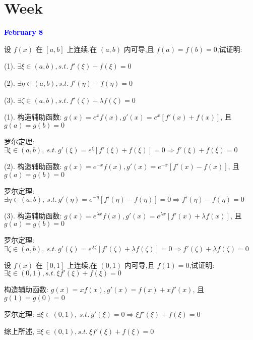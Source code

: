 \section{Week }
\textcolor{blue}{\textbf{February 8}}

\begin{example}[][Exam: 28.2.1]
	设 $f(x)$ 在 $[a,b]$ 上连续,在 $(a,b)$ 内可导,且 $f(a)=f(b)=0$,试证明:

(1). $\exists \xi\in(a,b),s.t.\ f'(\xi)+f(\xi)=0$

(2). $\exists \eta\in(a,b),s.t.\ f'(\eta)-f(\eta)=0$

(3). $\exists \zeta\in(a,b),s.t.\ f'(\zeta)+\lambda f(\zeta)=0$
\end{example}

\begin{solution}

	(1). 构造辅助函数: $g(x) = e^{x}f(x), g'(x) = e^{x}\left[f'(x) + f(x)\right]$, 且 $g(a) = g(b) = 0$

	罗尔定理: $\exists \xi\in(a,b),\ s.t.\ g'(\xi) = e^{\xi}\left[f'(\xi) + f(\xi)\right] = 0\Rightarrow f'(\xi) + f(\xi) = 0$

	

	(2). 构造辅助函数: $g(x) = e^{-x}f(x), g'(x) = e^{-x}\left[f'(x) - f(x)\right]$, 且 $g(a) = g(b) = 0$

	罗尔定理: $\exists \eta\in(a,b),\ s.t.\ g'(\eta) = e^{-\eta}\left[f'(\eta) - f(\eta)\right] = 0\Rightarrow f'(\eta) - f(\eta) = 0$

	

	(3). 构造辅助函数: $g(x) = e^{\lambda x}f(x), g'(x) = e^{\lambda x}\left[f'(x) + \lambda f(x)\right]$, 且 $g(a) = g(b) = 0$

	罗尔定理: $\exists \zeta\in(a,b),\ s.t.\ g'(\zeta) = e^{\lambda\zeta}\left[f'(\zeta) + \lambda f(\zeta)\right] = 0\Rightarrow f'(\zeta) + \lambda f(\zeta) = 0$
\end{solution}

\begin{example}[][Exam: 28.2.2]
	设 $f(x)$ 在 $[0,1]$ 上连续,在 $(0,1)$ 内可导,且 $f(1)=0$,试证明:$\exists \xi\in(0,1),s.t.\ \xi f'(\xi) + f(\xi) = 0$
\end{example}

\begin{solution}

	构造辅助函数: $g(x) = xf(x), g'(x) = f(x) +xf'(x)$, 且 $g(1) = g(0) = 0$

	罗尔定理: $\exists \xi\in(0,1),\ s.t.\ g'(\xi) = 0\Rightarrow \xi f'(\xi) + f(\xi) = 0$

	综上所述, $\exists \xi\in(0,1),s.t.\ \xi f'(\xi) + f(\xi) = 0$
\end{solution}

